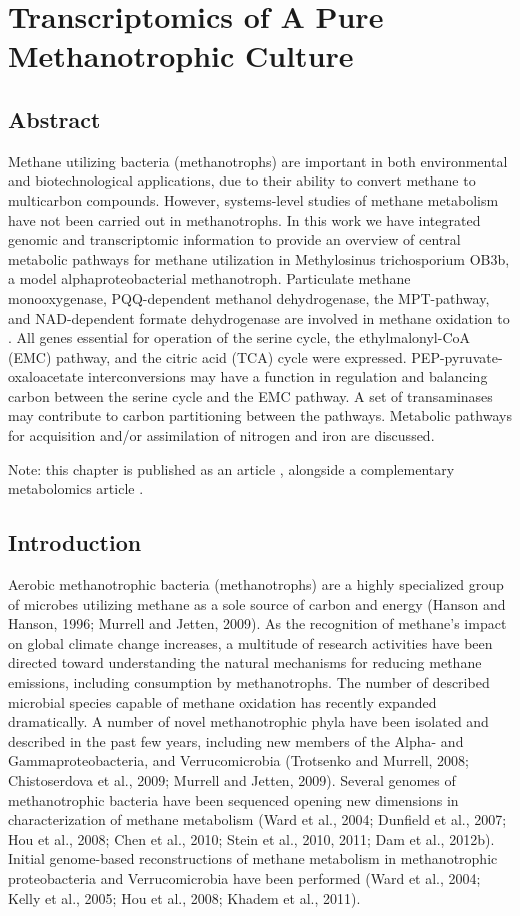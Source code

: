 \chapter{Transcriptomics of A Pure Methanotrophic Culture}
\label{chapter:A}


\section{Abstract}
Methane utilizing bacteria (methanotrophs) are important in both environmental and biotechnological applications, due to their ability to convert methane to multicarbon compounds.
However, systems-level studies of methane metabolism have not been carried out in methanotrophs.
In this work we have integrated genomic and transcriptomic information to provide an overview of central metabolic pathways for methane utilization in Methylosinus trichosporium OB3b, a model alphaproteobacterial methanotroph.
Particulate methane monooxygenase, PQQ-dependent methanol dehydrogenase, the MPT-pathway, and NAD-dependent formate dehydrogenase are involved in methane oxidation to .
All genes essential for operation of the serine cycle, the ethylmalonyl-CoA (EMC) pathway, and the citric acid (TCA) cycle were expressed.
PEP-pyruvate-oxaloacetate interconversions may have a function in regulation and balancing carbon between the serine cycle and the EMC pathway.
A set of transaminases may contribute to carbon partitioning between the pathways.
Metabolic pathways for acquisition and/or assimilation of nitrogen and iron are discussed.

Note: this chapter is published as an article \cite{matsenOB3b}, alongside a complementary metabolomics article \cite{yangOB3b}.

\section{Introduction}
Aerobic methanotrophic bacteria (methanotrophs) are a highly specialized group of microbes utilizing methane as a sole source of carbon and energy (Hanson and Hanson, 1996; Murrell and Jetten, 2009).
As the recognition of methane’s impact on global climate change increases, a multitude of research activities have been directed toward understanding the natural mechanisms for reducing methane emissions, including consumption by methanotrophs.
The number of described microbial species capable of methane oxidation has recently expanded dramatically.
A number of novel methanotrophic phyla have been isolated and described in the past few years, including new members of the Alpha- and Gammaproteobacteria, and Verrucomicrobia (Trotsenko and Murrell, 2008; Chistoserdova et al., 2009; Murrell and Jetten, 2009).
Several genomes of methanotrophic bacteria have been sequenced opening new dimensions in characterization of methane metabolism (Ward et al., 2004; Dunfield et al., 2007; Hou et al., 2008; Chen et al., 2010; Stein et al., 2010, 2011; Dam et al., 2012b).
Initial genome-based reconstructions of methane metabolism in methanotrophic proteobacteria and Verrucomicrobia have been performed (Ward et al., 2004; Kelly et al., 2005; Hou et al., 2008; Khadem et al., 2011).

